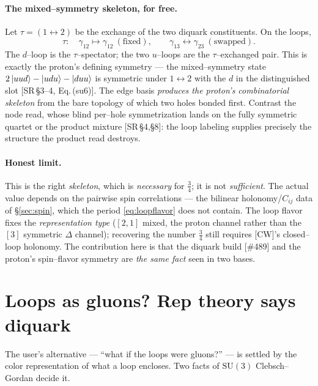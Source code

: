\documentclass[11pt,oneside]{article}
\newcommand{\SU}{\mathrm{SU}}
\theoremstyle{plain}
\begin{document}
\paragraph{The mixed--symmetry skeleton, for free.}
Let $\tau=(1\!\leftrightarrow\!2)$ be the exchange of the two diquark
constituents. On the loops,
\begin{equation}
  \tau:\quad \gamma_{12}\mapsto\gamma_{12}\ (\text{fixed}),\qquad
  \gamma_{13}\leftrightarrow\gamma_{23}\ (\text{swapped}).
  \label{eq:tau}
\end{equation}
The $d$--loop is the $\tau$--spectator; the two $u$--loops are the $\tau$--exchanged
pair. This is exactly the proton's defining symmetry --- the mixed--symmetry state
$2\ket{uud}-\ket{udu}-\ket{duu}$ is symmetric under $1\!\leftrightarrow\!2$ with
the $d$ in the distinguished slot [SR\,\S3--4, Eq.\,(su6)]. The edge basis
\emph{produces the proton's combinatorial skeleton} from the bare topology of
which two holes bonded first. Contrast the node read, whose blind per--hole
symmetrization lands on the fully symmetric quartet or the product mixture
[SR\,\S4,\S8]: the loop labeling supplies precisely the structure the product read
destroys.

\paragraph{Honest limit.}
This is the right \emph{skeleton}, which is \emph{necessary} for $\tfrac34$; it is
not \emph{sufficient}. The actual value depends on the pairwise spin correlations
--- the bilinear holonomy/$C_{ij}$ data of \S\ref{sec:spin}, which the period
\eqref{eq:loopflavor} does not contain. The loop flavor fixes the
\emph{representation type} ($[2,1]$ mixed, the proton channel rather than the
$[3]$ symmetric $\Delta$ channel); recovering the number $\tfrac34$ still requires
[CW]'s closed--loop holonomy. The contribution here is that the diquark
build [\#489] and the proton's spin--flavor symmetry are \emph{the same fact} seen
in two bases.

\section{Loops as gluons? Rep theory says diquark}
\label{sec:gluon}

The user's alternative --- ``what if the loops were gluons?'' --- is settled by
the color representation of what a loop encloses. Two facts of $\SU(3)$
Clebsch--Gordan decide it.
\end{document}
